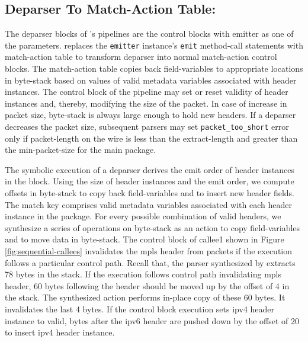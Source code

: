 \documentclass[letterpaper,twocolumn,10pt]{article}
\begin{document}




\subsection{Deparser To Match-Action Table:}
\label{subsection:deparser-to-match-action-table}
The deparser blocks of \uarch's pipelines are the control blocks with emitter as one of the parameters.
\ucomp replaces the \texttt{emitter} instance's \texttt{emit} method-call statements with match-action table to transform deparser into normal match-action control blocks.
The match-action table copies back field-variables to appropriate locations in byte-stack based on values of valid metadata variables associated with header instances. 
The control block of the pipeline may set or reset validity of header instances and, thereby, modifying the size of the packet.
In case of increase in packet size, byte-stack is always large enough to hold new headers.
If a deparser decreases the packet size, subsequent parsers may set \texttt{packet\_too\_short} error only if packet-length on the wire is less than the extract-length and greater than the min-packet-size for the main package.

The symbolic execution of a deparser derives the emit order of header instances in the block.
Using the size of header instances and the emit order, we compute offsets in byte-stack to copy back field-variables and to insert new header fields.
The match key comprises valid metadata variables associated with each header instance in the package.
For every possible combination of valid headers, we synthesize a series of operations on byte-stack as an action to copy field-variables and to move data in byte-stack.
The control block of callee1 shown in Figure \ref{fig:sequential-callees} invalidates the mpls header from packets if the execution follows a particular control path.
Recall that, the parser synthesized by \ucomp extracts 78 bytes in the stack.
If the execution follows control path invalidating mpls header, 60 bytes following the header should be moved up by the offset of 4 in the stack.
The synthesized action performs in-place copy of these 60 bytes. It invalidates the last 4 bytes.
If the control block execution sets ipv4 header instance to valid, bytes after the ipv6 header are pushed down by the offset of 20 to insert ipv4 header instance.
\end{document}
